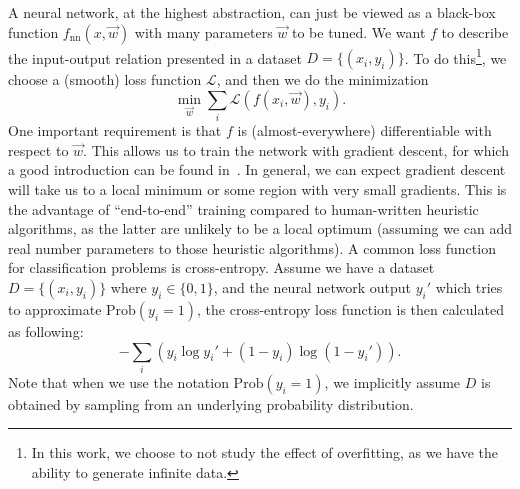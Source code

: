 A neural network, at the highest abstraction, can just be viewed as a black-box function $f_{\text{nn}}(x,\vec{w})$ with many parameters $\vec{w}$ to be tuned.
We want $f$ to describe the input-output relation presented in a dataset $D=\{(x_i, y_i)\}$.
To do this\footnote{In this work, we choose to not study the effect of overfitting, as we have the ability to generate infinite data.}, we choose a (smooth) loss function $\mathcal{L}$, and then we do the minimization
\begin{equation}
\min_{\vec{w}}\sum_i \mathcal{L}(f(x_i, \vec{w}), y_i) .
\end{equation}
One important requirement is that $f$ is (almost-everywhere) differentiable with respect to $\vec{w}$.
This allows us to train the network with gradient descent, for which a good introduction can be found in~\cite{goh2017why}.
In general, we can expect gradient descent will take us to a local minimum or some region with very small gradients.
This is the advantage of ``end-to-end'' training compared to human-written heuristic algorithms, as the latter are unlikely to be a local optimum (assuming we can add real number parameters to those heuristic algorithms).
A common loss function for classification problems is cross-entropy.
Assume we have a dataset $D=\{(x_i, y_i)\}$ where $y_i\in \{0,1\}$, and the neural network output $y_i'$ which tries to approximate $\text{Prob}(y_i=1)$, the cross-entropy loss function is then calculated as following:
\begin{equation}
-\sum_i \left( y_i \log y_i' + \left(1-y_i\right) \log \left(1-y_i'\right)\right).
\end{equation}
Note that when we use the notation $\text{Prob}(y_i=1)$, we implicitly assume $D$ is obtained by sampling from an underlying probability distribution.

